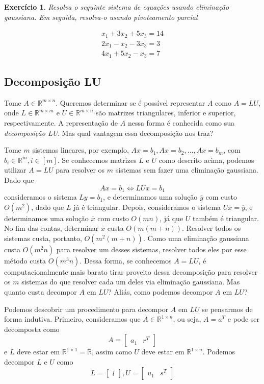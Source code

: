 \documentclass[]{article}
\newtheorem{exercicio}{Exercício}
\numberwithin{equation}{section}
\begin{document}
\begin{exercicio}
  Resolva o seguinte sistema de equações usando eliminação gaussiana. Em seguida, resolva-o usando pivoteamento parcial

  \begin{align}
  x_1 + 3x_2 + 5x_3 = 14 \\
  2x_1 - x_2 - 3x_3 = 3 \\
  4x_1 + 5x_2 - x_3 = 7
  \end{align}
\end{exercicio}

\subsection{Decomposição LU}

Tome $A \in \mathbb{R}^{m \times n}$. Queremos determinar se é possível representar $A$ como $A = LU$, onde $L \in \mathbb{R}^{m \times m}$ e $U \in \mathbb{R}^{m \times n}$ são matrizes triangulares, inferior e superior, respectivamente. A representação de $A$ nessa forma é conhecida como sua \emph{decomposição LU}. Mas qual vantagem essa decomposição nos traz?

Tome $m$ sistemas lineares, por exemplo, $Ax = b_1, Ax = b_2, \dots, Ax = b_m$, com $b_i \in \mathbb{R}^m, i \in [m]$. Se conhecemos matrizes $L$ e $U$ como descrito acima, podemos utilizar $A = LU$ para resolver os $m$ sistemas sem fazer uma eliminação gaussiana. Dado que
$$
Ax = b_1 \iff LUx = b_1
$$
consideramos o sistema $Ly = b_1$, e determinamos uma solução $\overline{y}$ com custo $O(m^2)$, dado que $L$ já é triangular. Depois, consideramos o sistema $Ux = \overline{y}$, e determinamos uma solução $\overline{x}$ com custo $O(mn)$, já que $U$ também é triangular. No fim das contas, determinar $\overline{x}$ custa $O(m(m + n))$. Resolver todos os sistemas custa, portanto, $O(m^2(m + n))$. Como uma eliminação gaussiana custa $O(m^2n)$ para resolver um desses sistemas, resolver todos eles por esse método custa $O(m^3n)$. Dessa forma, se conhecemos $A = LU$, é computacionalmente mais barato tirar proveito dessa decomposição para resolver os $m$ sistemas do que resolver cada um deles via eliminação gaussiana. Mas quanto custa decompor $A$ em $LU$? Aliás, como podemos decompor $A$ em $LU$?

Podemos descobrir um procedimento para decompor $A$ em $LU$ se pensarmos de forma indutiva. Primeiro, consideramos que $A \in \mathbb{R}^{1 \times n}$, ou seja, $A = a^T$ e pode ser decomposta como
$$
A =
\begin{bmatrix}
a_1 & r^T
\end{bmatrix}
$$
e $L$ deve estar em $\mathbb{R}^{1 \times 1} = \mathbb{R}$, assim como $U$ deve estar em $\mathbb{R}^{1 \times n}$. Podemos decompor $L$ e $U$ como
$$
L =
\begin{bmatrix}
l
\end{bmatrix}
,
U =
\begin{bmatrix}
u_1 & s^T
\end{bmatrix}
$$
\end{document}
